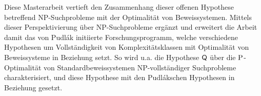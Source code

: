 Diese Masterarbeit vertieft den Zusammenhang dieser offenen Hypothese betreffend NP-Suchprobleme mit der Optimalität von Beweissystemen. Mittels dieser Perspektivierung über NP-Suchprobleme ergänzt und erweitert die Arbeit damit das von Pudlák initiierte Forschungsprogramm, welche verschiedene Hypothesen um Vollständigkeit von Komplexitätsklassen mit Optimalität von Beweissysteme in Beziehung setzt.
So wird u.a. die Hypothese $\hQ$ über die $\P$-Optimalität von Standardbeweissystemen NP-vollständiger Suchprobleme charakterisiert, und diese Hypothese mit den Pudlákschen Hypothesen in Beziehung gesetzt.
\cleardoublepage

\tableofcontents
\thispagestyle{empty}
\cleardoublepage
{}
\pagestyle{main}

